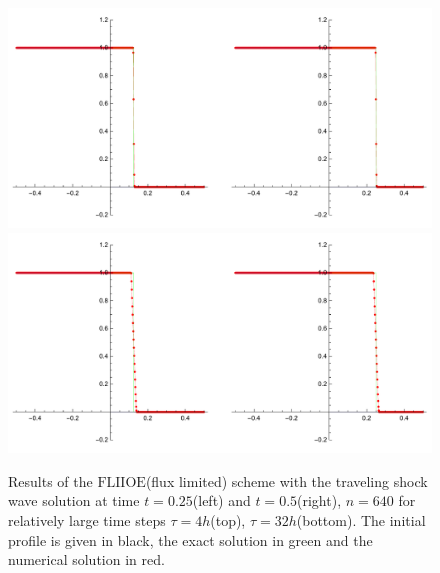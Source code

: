 \documentclass[../include.tex]{subfiles}
\begin{document}
\begin{figure}[H]
	\centering
	\includegraphics[width=.9\textwidth]{figures/inviscidShock640c4}
	\includegraphics[width=.9\textwidth]{figures/inviscidShock640c32}
	\caption{Results of the $\mathrm{FLIIOE}$(flux limited) scheme with the traveling shock wave solution at time $ t=0.25 $(left) and $ t=0.5 $(right), $ n=640 $ for relatively large time steps $ \tau=4h $(top), $ \tau=32h $(bottom). The initial profile is given in black, the exact solution in green and the numerical solution in red.}
	\label{fig:fliioe_burg_shock}
\end{figure}
\end{document}
